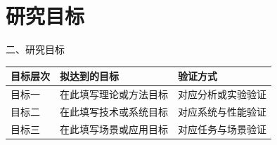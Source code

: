 \documentclass[10pt,aspectratio=169]{beamer}
\begin{document}
\section{研究目标}
\begin{frame}{二、研究目标}
  \vspace{0.45cm}
  \renewcommand{\arraystretch}{1.65}
  \begin{tabularx}{\linewidth}{@{}lXX@{}}
    \toprule
    \textbf{目标层次} & \textbf{拟达到的目标} & \textbf{验证方式}\\
    \midrule
    目标一 & 在此填写理论或方法目标 & 对应分析或实验验证\\
    目标二 & 在此填写技术或系统目标 & 对应系统与性能验证\\
    目标三 & 在此填写场景或应用目标 & 对应任务与场景验证\\
    \bottomrule
  \end{tabularx}
  \vspace{0.4cm}
\end{frame}
\end{document}
